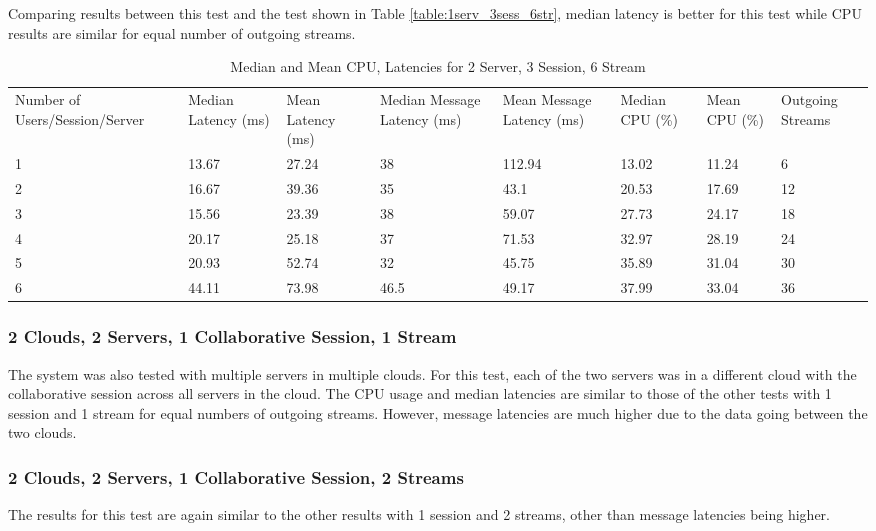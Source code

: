 Comparing results between this test and the test shown in Table \ref{table:1serv_3sess_6str}, median latency is better for this test while CPU results are similar for equal number of outgoing streams.
 
\begin{table}
\caption{Median and Mean CPU, Latencies for 2 Server, 3 Session, 6 Stream}
\label{table:2serv_3sess_6str}
\begin{tabu} to\linewidth{|X[c]|X[c]|X[c]|X[c]|X[c]|X[c]|X[c]|X[c]|}
\everyrow{\hline}
\hline
Number of Users/Session/Server & Median Latency (ms) & Mean Latency (ms) & Median Message Latency (ms) & Mean Message Latency (ms) & Median CPU (\%) & Mean CPU (\%) & Outgoing Streams\\
1 & 13.67 & 27.24 & 38 & 112.94 & 13.02 & 11.24 & 6 \\
2 & 16.67 & 39.36 & 35 & 43.1 & 20.53 & 17.69 & 12 \\
3 & 15.56 & 23.39 & 38 & 59.07 & 27.73 & 24.17 & 18 \\
4 & 20.17 & 25.18 & 37 & 71.53 & 32.97 & 28.19 & 24 \\
5 & 20.93 & 52.74 & 32 & 45.75 & 35.89 & 31.04 & 30 \\
6 & 44.11 & 73.98 & 46.5 & 49.17 & 37.99 & 33.04 & 36 \\
\end{tabu}
\end{table}

\clearpage\subsubsection{2 Clouds, 2 Servers, 1 Collaborative Session, 1 Stream}

The system was also tested with multiple servers in multiple clouds. For this test, each of the two servers was in a different cloud with the collaborative session across all servers in the cloud. The CPU usage and median latencies are similar to those of the other tests with 1 session and 1 stream for equal numbers of outgoing streams. However, message latencies are much higher due to the data going between the two clouds.

\subsubsection{2 Clouds, 2 Servers, 1 Collaborative Session, 2 Streams}

The results for this test are again similar to the other results with 1 session and 2 streams, other than message latencies being higher.

